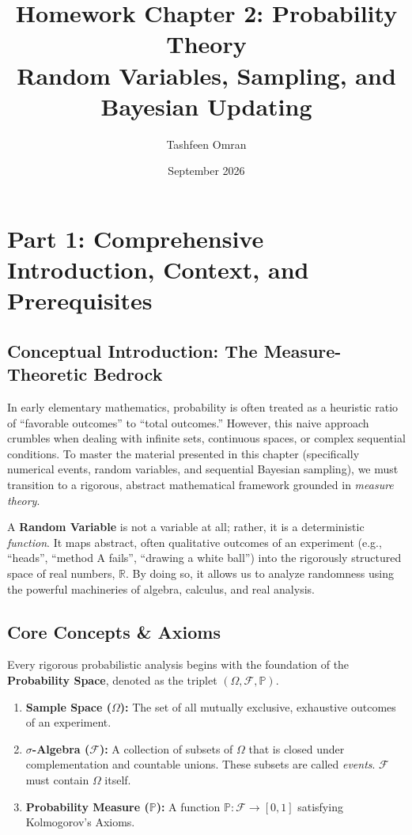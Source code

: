 \documentclass[11pt, letterpaper]{article}
\title{\textbf{Homework Chapter 2: Probability Theory \\ Random Variables, Sampling, and Bayesian Updating}}
\author{Tashfeen Omran}
\date{September 2026}
\theoremstyle{definition}
\newcommand{\F}{\mathcal{F}}
\renewcommand{\P}{\mathbb{P}}
\begin{document}
\maketitle
\tableofcontents
\newpage

\section{Part 1: Comprehensive Introduction, Context, and Prerequisites}

\subsection{Conceptual Introduction: The Measure-Theoretic Bedrock}
In early elementary mathematics, probability is often treated as a heuristic ratio of ``favorable outcomes'' to ``total outcomes.'' However, this naive approach crumbles when dealing with infinite sets, continuous spaces, or complex sequential conditions. To master the material presented in this chapter (specifically numerical events, random variables, and sequential Bayesian sampling), we must transition to a rigorous, abstract mathematical framework grounded in \textit{measure theory}. 

A \textbf{Random Variable} is not a variable at all; rather, it is a deterministic \textit{function}. It maps abstract, often qualitative outcomes of an experiment (e.g., ``heads'', ``method A fails'', ``drawing a white ball'') into the rigorously structured space of real numbers, $\mathbb{R}$. By doing so, it allows us to analyze randomness using the powerful machineries of algebra, calculus, and real analysis. 

\subsection{Core Concepts \& Axioms}
Every rigorous probabilistic analysis begins with the foundation of the \textbf{Probability Space}, denoted as the triplet $(\Omega, \F, \P)$.
\begin{enumerate}
    \item \textbf{Sample Space ($\Omega$):} The set of all mutually exclusive, exhaustive outcomes of an experiment.
    \item \textbf{$\sigma$-Algebra ($\F$):} A collection of subsets of $\Omega$ that is closed under complementation and countable unions. These subsets are called \textit{events}. $\F$ must contain $\Omega$ itself.
    \item \textbf{Probability Measure ($\P$):} A function $\P: \F \to [0, 1]$ satisfying Kolmogorov's Axioms.
\end{enumerate}
\end{document}
